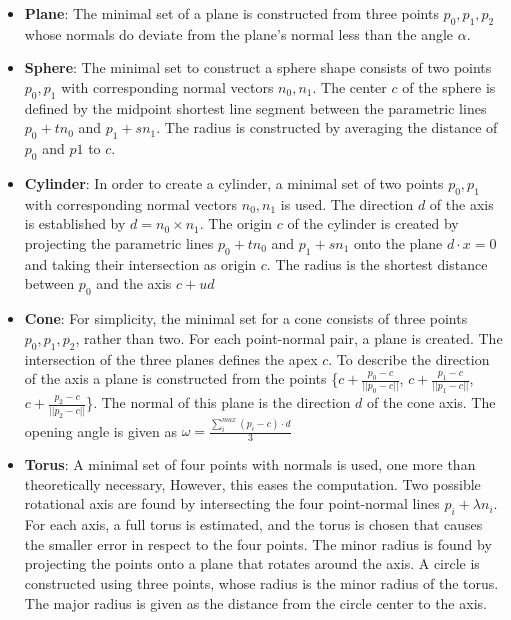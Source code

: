 \begin{itemize}
    \item \textbf{Plane}: The minimal set of a plane is constructed from three points $p_0, p_1, p_2$ whose normals do deviate from the plane's normal less than the angle $\alpha$. 
    
    \item \textbf{Sphere}: The minimal set to construct a sphere shape consists of two points $p_0, p_1$ with corresponding normal vectors $n_0, n_1$. The center $c$ of the sphere is defined by the midpoint shortest line segment between the parametric lines $p_0 + tn_0$ and $p_1 + sn_1$. The radius is constructed by averaging the distance of $p_0$ and $p1$ to $c$.

    \item \textbf{Cylinder}:
    In order to create a cylinder, a minimal set of two points  $p_0, p_1$ with corresponding normal vectors $n_0, n_1$ is used. The direction $d$ of the axis is established by $d = n_0 \times n_1$. The origin $c$ of the cylinder is created by projecting the parametric lines $p_0 + tn_0$ and $p_1 + sn_1$ onto the plane $d \cdot x = 0$ and taking their intersection as origin $c$. The radius is the shortest distance between $p_0$ and the axis $c + ud$
    
    \item \textbf{Cone}:
    For simplicity, the minimal set for a cone consists of three points $p_0, p_1, p_2$, rather than two. For each point-normal pair, a plane is created. The intersection of the three planes defines the apex $c$. To describe the direction of the axis a plane is constructed from the points \{$c +  \frac{p_0 - c}{||p_0 - c||}$, $c +  \frac{p_1 - c}{||p_1 - c||}$, $c +  \frac{p_2 - c}{||p_2 - c||}$\}. The normal of this plane is the direction $d$ of the cone axis. The opening angle is given as $\omega = \frac{\sum_{i}^{max} (p_i - c)\cdot d}{3}$
    
    \item \textbf{Torus}:
    A minimal set of four points with normals is used, one more than theoretically necessary, However, this eases the computation.
    Two possible rotational axis are found by intersecting the four point-normal lines $p_i +  \lambda n_i$\cite{marshall2001robust}. For each axis, a full torus is estimated, and the torus is chosen that causes the smaller error in respect to the four points. The minor radius is found by projecting the points onto a plane that rotates around the axis. A circle is constructed using three points, whose radius is the minor radius of the torus. The major radius is given as the distance from the circle center to the axis. 


\end{itemize} 

